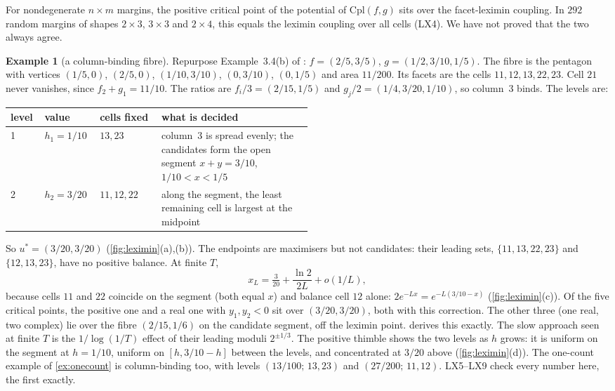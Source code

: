 \documentclass[11pt]{article}
\theoremstyle{definition}\newtheorem{definition}[theorem]{Definition}\newtheorem{remark}[theorem]{Remark}\newtheorem{example}[theorem]{Example}\newtheorem{problem}[theorem]{Open problem}\crefname{problem}{Problem}{Problems}
\begin{document}
\begin{corollary}\label{cor:leximin}
For nondegenerate $n\times m$ margins, the positive critical point of the potential of $\mathrm{Cpl}(f,g)$ sits over the facet-leximin coupling. In $292$ random margins of shapes
$2\times3$, $3\times3$ and $2\times4$, this equals the leximin coupling over all cells (LX4). We have not proved that the two always agree.
\end{corollary}

\begin{example}[a column-binding fibre]\label{ex:colbind}
Repurpose Example~3.4(b) of \cite{Awasthi2026Cpl}: $f=(2/5,3/5)$, $g=(1/2,3/10,1/5)$. The fibre is the pentagon with vertices $(1/5,0)$, $(2/5,0)$, $(1/10,3/10)$, $(0,3/10)$, $(0,1/5)$ and area $11/200$. Its facets are the
cells $11,12,13,22,23$. Cell $21$ never vanishes, since $f_2+g_1=11/10$. The ratios are $f_i/3=(2/15,1/5)$ and $g_j/2=(1/4,3/20,1/10)$, so column~3 binds. The levels are:
\begin{center}\small
\begin{tabular}{lll>{\raggedright\arraybackslash}p{0.5\linewidth}}\toprule
level & value & cells fixed & what is decided\\\midrule
1 & $h_1=1/10$ & $13,23$ & column~3 is spread evenly; the candidates form the open segment $x+y=3/10$, $1/10<x<1/5$\\
2 & $h_2=3/20$ & $11,12,22$ & along the segment, the least remaining cell is largest at the midpoint\\\bottomrule
\end{tabular}
\end{center}
So $u^*=(3/20,3/20)$ (\cref{fig:leximin}(a),(b)). The endpoints are maximisers but not candidates: their leading sets, $\{11,13,22,23\}$ and $\{12,13,23\}$, have no positive balance. At finite $T$,
\[
x_L=\tfrac{3}{20}+\frac{\ln2}{2L}+o(1/L),
\]
because cells $11$ and $22$ coincide on the segment (both equal $x$) and balance cell $12$ alone: $2e^{-Lx}=e^{-L(3/10-x)}$ (\cref{fig:leximin}(c)). Of the five critical points, the positive one
and a real one with $y_1,y_2<0$ sit over $(3/20,3/20)$, both with this correction. The other three (one real, two complex) lie over the fibre $(2/15,1/6)$ on the candidate segment, off the leximin point.  derives this exactly. The slow approach seen at finite $T$ is
the $1/\log(1/T)$ effect of their leading moduli $2^{\pm1/3}$. The positive thimble shows the two levels as $h$ grows: it is uniform on the segment at
$h=1/10$, uniform on $[h,3/10-h]$ between the levels, and concentrated at $3/20$ above (\cref{fig:leximin}(d)). The one-count example of \cref{ex:onecount} is column-binding too, with levels
$(13/100;\,13,23)$ and $(27/200;\,11,12)$. LX5--LX9 check every number here, the first exactly.
\end{example}
\end{document}
